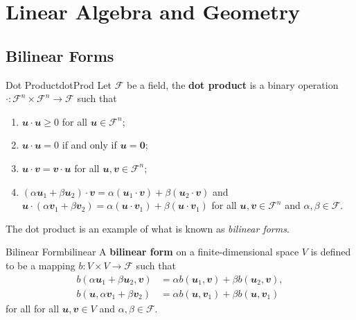 \documentclass[math, code]{amznotes}
\theoremstyle{remark}
\newcommand{\zero}{\mathbf{0}}
\begin{document}
\chapter{Linear Algebra and Geometry}
\section{Bilinear Forms}
\begin{dfnbox}{Dot Product}{dotProd}
    Let $\mathcal{F}$ be a field, the {\color{red} \textbf{dot product}} is a binary operation $\cdot \colon \mathcal{F}^n \times \mathcal{F}^n \to \mathcal{F}$ such that 
    \begin{enumerate}
        \item $\mathbfit{u} \cdot \mathbfit{u} \geq 0$ for all $\mathbfit{u} \in \mathcal{F}^n$;
        \item $\mathbfit{u} \cdot \mathbfit{u} = 0$ if and only if $\mathbfit{u} = \zero$;
        \item $\mathbfit{u} \cdot \mathbfit{v} = \mathbfit{v} \cdot \mathbfit{u}$ for all $\mathbfit{u}, \mathbfit{v} \in \mathcal{F}^n$;
        \item $(\alpha\mathbfit{u}_1 + \beta\mathbfit{u}_2) \cdot \mathbfit{v} = \alpha(\mathbfit{u}_1 \cdot \mathbfit{v}) + \beta(\mathbfit{u}_2 \cdot \mathbfit{v})$ and $\mathbfit{u} \cdot (\alpha\mathbfit{v}_1 + \beta\mathbfit{v}_2) = \alpha(\mathbfit{u} \cdot \mathbfit{v}_1) + \beta(\mathbfit{u} \cdot \mathbfit{v}_1)$ for all $\mathbfit{u}, \mathbfit{v} \in \mathcal{F}^n$ and $\alpha, \beta \in \mathcal{F}$.
    \end{enumerate}
\end{dfnbox}
The dot product is an example of what is known as \textit{bilinear forms}.
\begin{dfnbox}{Bilinear Form}{bilinear}
    A {\color{red} \textbf{bilinear form}} on a finite-dimensional space $V$ is defined to be a mapping $b \colon V \times V \to \mathcal{F}$ such that 
    \begin{align*}
        b(\alpha\mathbfit{u}_1 + \beta\mathbfit{u}_2, \mathbfit{v}) & = \alpha b(\mathbfit{u}_1, \mathbfit{v}) + \beta b(\mathbfit{u}_2, \mathbfit{v}), \\
        b(\mathbfit{u}, \alpha\mathbfit{v}_1 + \beta\mathbfit{v}_2) & = \alpha b(\mathbfit{u}, \mathbfit{v}_1) + \beta b(\mathbfit{u}, \mathbfit{v}_1)
    \end{align*}
    for all for all $\mathbfit{u}, \mathbfit{v} \in V$ and $\alpha, \beta \in \mathcal{F}$.
\end{dfnbox}
\end{document}

